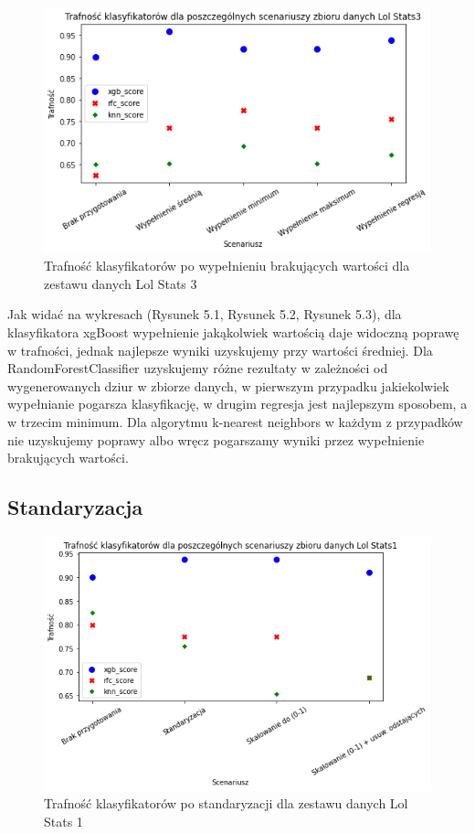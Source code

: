 \documentclass{book}
\begin{document}
\begin{figure}[H]
\centerline{\includegraphics[scale=0.5]{Lol_Stats_3_Wypełnienie_brakujących}}
\centering
\caption{Trafność klasyfikatorów po wypełnieniu brakujących wartości dla zestawu danych Lol Stats 3}
\end{figure}


Jak widać na wykresach (Rysunek 5.1, Rysunek 5.2, Rysunek 5.3), dla klasyfikatora xgBoost wypełnienie jakąkolwiek wartością daje widoczną poprawę w trafności, 
jednak najlepsze wyniki uzyskujemy przy wartości średniej. Dla RandomForestClassifier uzyskujemy 
różne rezultaty w zależności od wygenerowanych dziur w zbiorze danych, w pierwszym przypadku jakiekolwiek 
wypełnianie pogarsza klasyfikację, w drugim regresja jest najlepszym sposobem, a w trzecim minimum. 
Dla algorytmu k-nearest neighbors w każdym z przypadków nie uzyskujemy poprawy albo wręcz pogarszamy wyniki przez 
wypełnienie brakujących wartości.

\subsection{Standaryzacja}

\begin{figure}[H]
\centerline{\includegraphics[scale=0.5]{Lol_Stats_1_Standaryzacja}}
\centering
\caption{Trafność klasyfikatorów po standaryzacji dla zestawu danych Lol Stats 1}
\end{figure}
\end{document}

